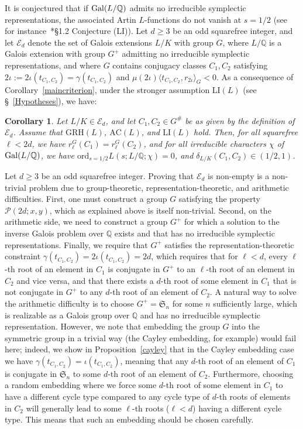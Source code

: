 \documentclass[12pt]{amsart}
\numberwithin{equation}{section}
\newcommand{\Gal}{{\rm Gal}}
\newcommand{\Q}{\mathbb Q}
\newtheorem{cor}[X]{Corollary}
\theoremstyle{definition}
\theoremstyle{remark}
\begin{document}
It is conjectured that if $\Gal(L/\Q)$ admits no irreducible symplectic representations, the associated Artin $L$-functions do not vanish at $s=1/2$ (see for instance~\cite{FJ}*{\S 1.2 Conjecture (LI)}).
Let $d\ge3 $ be an odd squarefree integer, and let $\mathcal{E}_d$ denote the set of Galois extensions $L/K$ with group $G$, where $L/\Q$ is a Galois extension with group $G^+$ admitting no irreducible symplectic representations, and where $G$ contains conjugacy classes $C_1,C_2$ satisfying $2\iota:=2\iota(t_{C_1,C_2})=\gamma(t_{C_1,C_2})$ and $\mu(2\iota)\langle t_{C_1,C_2}, r_{2\iota}\rangle_G<0$. As a consequence of Corollary~\ref{maincriterion}, under the stronger assumption $\mathrm{LI}(L)$ (see \S~\ref{Hypotheses}), we have:
\begin{cor}\label{E_d-criterion}
    Let $L/K\in \mathcal{E}_d$, and let $C_1,C_2\in G^\#$ be as given by the definition of $\mathcal{E}_d$. Assume that $\mathrm{GRH}(L)$, $\mathrm{AC}(L)$, and $\mathrm{LI}(L)$ hold. Then, for all squarefree $\ell<2d$, we have $r_\ell^G(C_1)=r_\ell^G(C_2)$, and for all irreducible characters $\chi$ of $\Gal(L/\Q)$, we have $\mathrm{ord}_{s=1/2}L(s;L/\Q;\chi)=0$, and $\delta_{L/K}(C_1,C_2)\in (1/2, 1)$.
    \end{cor}
Let $d\ge 3$ be an odd squarefree integer. Proving that $\mathcal{E}_d$ is non-empty is a non-trivial problem due to group-theoretic, representation-theoretic, and arithmetic difficulties. First, one must construct a group $G$ satisfying the property $\mathcal{P}(2d;x,y)$, which as explained above is itself non-trivial.
Second, on the arithmetic side, we need to construct a group $G^+$ for which a solution to the inverse Galois problem over $\Q$ exists and that has no irreducible symplectic representations. Finally, we require that $G^+$ satisfies the representation-theoretic constraint $\gamma(t_{C_1,C_2})=2\iota(t_{C_1,C_2})=2d$, which requires that for $\ell<d$, every $\ell$-th root of an element in $C_1$ is conjugate in $G^+$ to an $\ell$-th root of an element in $C_2$ and vice versa, and that there exists a $d$-th root of some element in $C_1$ that is not conjugate in $G^+$ to any $d$-th root of an element of $C_2$. 
A natural way to solve the arithmetic difficulty is to choose $G^+=\mathfrak{S}_n$ for some $n$ sufficiently large, which is realizable as a Galois group over $\Q$ and has no irreducible symplectic representation. However, we note that embedding the group $G$ into the symmetric group in a trivial way (the Cayley embedding, for example) would fail here; indeed, we show in Proposition~\ref{cayley} that in the Cayley embedding case we have $\gamma(t_{C_1,C_2})=\iota(t_{C_1,C_2})$, meaning that any $d$-th root of an element of $C_1$ is conjugate in $\mathfrak{S}_n$ to some $d$-th root of an element of $C_2$. Furthermore, choosing a random embedding where we force some $d$-th root of some element in $C_1$ to have a different cycle type compared to any cycle type of $d$-th roots of elements in $C_2$ will generally lead to some $\ell$-th roots ($\ell<d$) having a different cycle type. This means that such an embedding should be chosen carefully. 
\end{document}
